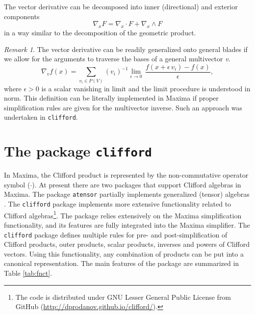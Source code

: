 \documentclass[twoside,reqno,11pt]{amsart}
\theoremstyle{definition}
\theoremstyle{remark}
\newtheorem{rem}[thm]{Remark}
\numberwithin{equation}{section}
\newcommand{\symb}[1]{{\tt #1}}
\newcommand{\mvectdiff}[1]{ \nabla_#1 }
\begin{document}
The vector derivative can be decomposed into inner (directional) and exterior components
\begin{equation}
\mvectdiff{x} F = \mvectdiff{x} \cdot F + \mvectdiff{x} \wedge F
\end{equation}
in a way similar to the decomposition of the geometric product.

\begin{rem}
	The vector derivative can be readily generalized onto general blades if we allow for the arguments to traverse the bases of a general multivector \textit{v}.
	\begin{equation}
	 	\mvectdiff{v} f (x) = \sum\limits_{v_i  \in P(V)}  {\left( v_i\right) }^{-1}  \lim\limits_{ \epsilon \rightarrow 0} \,  \frac{ f(x+ \epsilon \, {v_i}) - f(x) }{   \epsilon }  ,
	\end{equation}
	where $\epsilon >0$ is a scalar vanishing in limit and the limit procedure is understood in norm.
	This definition can be literally implemented in Maxima if proper simplification rules are given for the multivector inverse.
	Such an approach was undertaken in \symb{clifford}.
\end{rem}

\section{The package \symb{clifford}}
\label{sec:cliff}
In Maxima, the Clifford product is represented by the non-commutative operator symbol ($\cdot$).
At present there are two packages that support Clifford algebras in Maxima.
The package \symb{atensor}  partially implements generalized (tensor) algebras  \cite{M2015, Toth2007}.
The \symb{clifford} package implements more extensive functionality related to Clifford algebras\footnote{The code is distributed under  GNU Lesser General Public License from GitHub (\url{http://dprodanov.github.io/clifford/}).}.
The   package relies extensively on the Maxima simplification functionality, and its features are fully integrated into the Maxima simplifier.
The \symb{clifford} package defines multiple rules for pre- and post-simplification of Clifford products, outer products, scalar products, inverses and powers of Clifford vectors.
Using this functionality, any combination of products can be put into a canonical representation.
The main features of the package are summarized in Table \ref{tab:fnct}.
\end{document}
